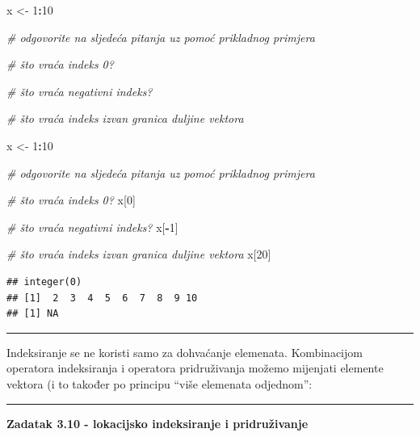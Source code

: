 \documentclass[]{book}
\newenvironment{Shaded}{\begin{snugshade}}{\end{snugshade}}
\newcommand{\DecValTok}[1]{\textcolor[rgb]{0.00,0.00,0.81}{#1}}
\newcommand{\StringTok}[1]{\textcolor[rgb]{0.31,0.60,0.02}{#1}}
\newcommand{\CommentTok}[1]{\textcolor[rgb]{0.56,0.35,0.01}{\textit{#1}}}
\newcommand{\OperatorTok}[1]{\textcolor[rgb]{0.81,0.36,0.00}{\textbf{#1}}}
\newcommand{\NormalTok}[1]{#1}
\theoremstyle{definition}
\theoremstyle{definition}
\theoremstyle{definition}
\theoremstyle{remark}
\begin{document}
\begin{Shaded}
\begin{Highlighting}[]
\NormalTok{x <-}\StringTok{ }\DecValTok{1}\OperatorTok{:}\DecValTok{10}

\CommentTok{# odgovorite na sljedeća pitanja uz pomoć prikladnog primjera}

\CommentTok{# što vraća indeks 0? }

\CommentTok{# što vraća negativni indeks? }

\CommentTok{# što vraća indeks izvan granica duljine vektora}
\end{Highlighting}
\end{Shaded}

\begin{Shaded}
\begin{Highlighting}[]
\NormalTok{x <-}\StringTok{ }\DecValTok{1}\OperatorTok{:}\DecValTok{10}

\CommentTok{# odgovorite na sljedeća pitanja uz pomoć prikladnog primjera}

\CommentTok{# što vraća indeks 0? }
\NormalTok{x[}\DecValTok{0}\NormalTok{]}

\CommentTok{# što vraća negativni indeks? }
\NormalTok{x[}\OperatorTok{-}\DecValTok{1}\NormalTok{]}

\CommentTok{# što vraća indeks izvan granica duljine vektora}
\NormalTok{x[}\DecValTok{20}\NormalTok{]}
\end{Highlighting}
\end{Shaded}

\begin{verbatim}
## integer(0)
## [1]  2  3  4  5  6  7  8  9 10
## [1] NA
\end{verbatim}

\begin{center}\rule{0.5\linewidth}{\linethickness}\end{center}

Indeksiranje se ne koristi samo za dohvaćanje elemenata. Kombinacijom
operatora indeksiranja i operatora pridruživanja možemo mijenjati
elemente vektora (i to također po principu ``više elemenata odjednom'':

\begin{center}\rule{0.5\linewidth}{\linethickness}\end{center}

\textbf{Zadatak 3.10 - lokacijsko indeksiranje i pridruživanje}
\end{document}
